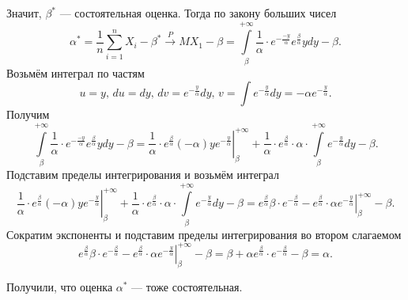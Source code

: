 Значит, $ \beta^*$ --- состоятельная оценка.
Тогда по закону больших чисел
$$ \alpha^* =
  \frac{1}{n} \sum \limits_{i = 1}^n X_i - \beta^* \overset{P}{ \to }
  MX_1 - \beta =
  \int \limits_{ \beta }^{+ \infty }
    \frac{1}{ \alpha } \cdot e^{- \frac{-y}{ \alpha }} e^{ \frac{ \beta }{ \alpha }} ydy -
  \beta. $$
Возьмём интеграл по частям
$$u = y, \,
  du = dy, \,
  dv = e^{- \frac{y}{ \alpha }} dy, \,
  v = \int e^{- \frac{y}{ \alpha }} dy = - \alpha e^{- \frac{y}{ \alpha }}.$$
Получим
$$ \int \limits_{ \beta }^{+ \infty }
    \frac{1}{ \alpha } \cdot e^{- \frac{-y}{ \alpha }} e^{ \frac{ \beta }{ \alpha }} ydy -
  \beta =
  \left.
    \frac{1}{ \alpha } \cdot
    e^{ \frac{ \beta }{ \alpha }} \left( - \alpha \right) y e^{- \frac{y}{ \alpha }}
  \right|_{ \beta }^{+ \infty } +
  \frac{1}{ \alpha } \cdot e^{ \frac{ \beta }{ \alpha }} \cdot \alpha \cdot
  \int \limits_{ \beta }^{+ \infty } e^{- \frac{y}{ \alpha }} dy -
  \beta.$$
Подставим пределы интегрирования и возьмём интеграл
$$ \left.
    \frac{1}{ \alpha } \cdot
    e^{ \frac{ \beta }{ \alpha }} \left( - \alpha \right) y e^{- \frac{y}{ \alpha }}
  \right|_{ \beta }^{+ \infty } +
  \frac{1}{ \alpha } \cdot e^{ \frac{ \beta }{ \alpha }} \cdot \alpha \cdot
  \int \limits_{ \beta }^{+ \infty } e^{- \frac{y}{ \alpha }} dy -
  \beta =
  e^{ \frac{ \beta }{ \alpha }} \beta \cdot e^{- \frac{ \beta }{ \alpha }} -
  e^{ \frac{ \beta }{ \alpha }} \cdot
  \left. \alpha e^{- \frac{y}{ \alpha }} \right|_{ \beta }^{+ \infty } -
  \beta.$$
Сократим экспоненты и подставим пределы интегрирования во втором слагаемом
$$e^{ \frac{ \beta }{ \alpha }} \beta \cdot e^{- \frac{ \beta }{ \alpha }} -
  e^{ \frac{ \beta }{ \alpha }} \cdot
  \left. \alpha e^{- \frac{y}{ \alpha }} \right|_{ \beta }^{+ \infty } -
  \beta =
  \beta + \alpha e^{ \frac{ \beta }{ \alpha }} \cdot e^{- \frac{ \beta }{ \alpha }} - \beta =
  \alpha.$$

Получили, что оценка $ \alpha^*$ --- тоже состоятельная.
